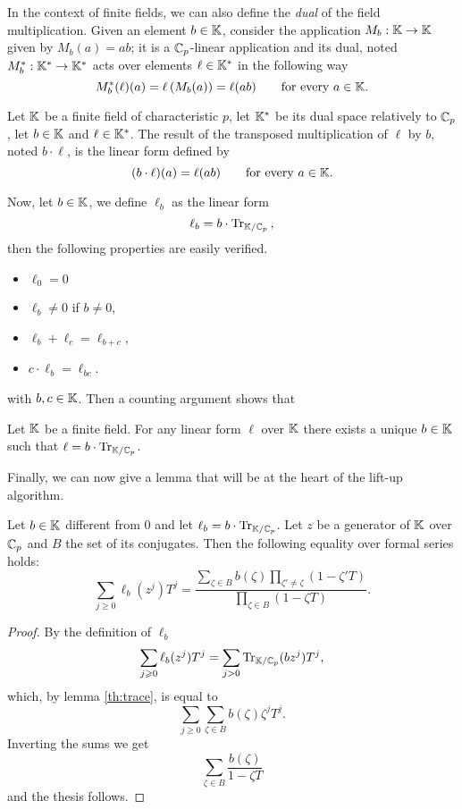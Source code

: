 In the context of finite fields, we can also define the \emph{dual} of
the field multiplication. Given an element $b\in\mathbb{K}$, consider the
application $M_b : \mathbb{K}\rightarrow\mathbb{K}$ given by $M_b(a) = ab$; it is a
$\mathbb{C}_p$-linear application and its dual, noted $M_b^\ast : \mathbb{K}^\ast
\rightarrow \mathbb{K}^\ast$ acts over elements $\ell\in\mathbb{K}^\ast$ in the
following way
\[M_b^\ast(\ell)(a) = \ell\left(M_b(a)\right) = \ell(ab) \qquad\text{for every $a\in\mathbb{K}$.}\]

\begin{definition}
  \label{def:transmul}
  Let $\mathbb{K}$ be a finite field of characteristic $p$, let $\mathbb{K}^\ast$ be
  its dual space relatively to $\mathbb{C}_p$, let $b\in\mathbb{K}$ and
  $\ell\in\mathbb{K}^\ast$. The result of the transposed multiplication of
  $\ell$ by $b$, noted $b\cdot\ell$, is the linear form defined by
  \[(b\cdot\ell)(a) = \ell(ab) \qquad\text{for every $a\in\mathbb{K}$.}\]
\end{definition}


Now, let $b\in\mathbb{K}$, we define $\ell_b$ as the linear form
\begin{equation}
  \ell_b = b\cdot\operatorname{Tr}_{\mathbb{K}/\mathbb{C}_p} \text{,}
\end{equation}
then the following properties are easily verified.
\begin{itemize}
\item $\ell_0 = 0$
\item $\ell_b \ne 0$ if $b\ne0$,
\item $\ell_b + \ell_c = \ell_{b+c}$,
\item $c \cdot \ell_b = \ell_{bc}$.
\end{itemize}
with $b,c\in\mathbb{K}$. Then a counting argument \cite[Theorem 2.24]{LN}
shows that
\begin{theorem}
  \label{th:linearforms}
  Let $\mathbb{K}$ be a finite field. For any linear form $\ell$ over $\mathbb{K}$
  there exists a unique $b\in\mathbb{K}$ such that $\ell =
  b\cdot\operatorname{Tr}_{\mathbb{K}/\mathbb{C}_p}$.
\end{theorem}

Finally, we can now give a lemma that will be at the heart of the
lift-up algorithm.

\begin{lemma}
  \label{th:lift-up}
  Let $b\in\mathbb{K}$ different from $0$ and let $\ell_b =
  b\cdot\operatorname{Tr}_{\mathbb{K}/\mathbb{C}_p}$. Let $z$ be a generator of $\mathbb{K}$ over $\mathbb{C}_p$ and
  $B$ the set of its conjugates. Then the following equality over
  formal series holds:
  \begin{equation*}
    \sum_{j\ge0} \ell_b(z^j)T^j =
    \frac{\sum_{\zeta\in B} b(\zeta)\prod_{\zeta'\ne\zeta}(1 - \zeta' T)}
	 {\prod_{\zeta\in B} (1- \zeta T)}
	 \text{.}
  \end{equation*}
\end{lemma}
\begin{proof}
  By the definition of $\ell_b$
  \[\sum_{j\geqslant0} \ell_b(z^j)T^j = \sum_{j>0} \operatorname{Tr}_{\mathbb{K}/\mathbb{C}_p}(bz^j)T^j
  \text{,}\]
  which, by lemma \ref{th:trace}, is equal to
  \[\sum_{j\ge0} \sum_{\zeta\in B} b(\zeta) \zeta^j T^j \text{.}\]
  Inverting the sums we get
  \[\sum_{\zeta \in B} \frac{b(\zeta)}{1- \zeta T} \]
  and the thesis follows.
\end{proof}


